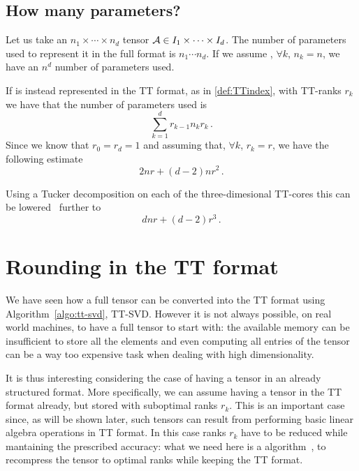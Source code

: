 \subsection{How many parameters?}
Let us take an $n_1 \times \cdots \times n_d$ tensor $\mathcal{A} \in I_1 \times \cdots \times I_d$. The number of parameters used to represent it in the full format is $n_1 \cdots n_d$. If we assume , $\forall k$, $n_k  = n$, we have an $n^d$ number of parameters used.

If \A is instead represented in the TT format, as in \eqref{def:TTindex}, with TT-ranks $r_k$ we have that the number of parameters used is
\begin{equation*}
  \sum_{k=1}^d r_{k-1} n_k r_k\, .
\end{equation*}
Since we know that $r_0 = r_d = 1$ and assuming that, $\forall k$, $r_k = r$, we have the following estimate
\begin{equation*}
  2nr + (d-2)nr^2\, .
\end{equation*}

Using a Tucker decomposition on each of the three-dimesional TT-cores this can be lowered~\cite{oseledets2011tt} further to
\begin{equation*}
  dnr + (d-2)r^3\, .
\end{equation*}

\section{Rounding in the TT format}
We have seen how a full tensor can be converted into the TT format using Algorithm~\ref{algo:tt-svd}, TT-SVD. However it is not always possible, on real world machines, to have a full tensor to start with: the available memory can be insufficient to store all the elements and even computing all entries of the tensor can be a way too expensive task when dealing with high dimensionality.

It is thus interesting considering the case of having a tensor in an already structured format. More specifically, we can assume having a tensor in the TT format already, but stored with suboptimal ranks $r_k$. This is an important case since, as will be shown later, such tensors can result from performing basic linear algebra operations in TT format. In this case ranks $r_k$ have to be reduced while mantaining the prescribed accuracy: what we need here is a  algorithm~\cite{oseledets2011tt}, to recompress the tensor to optimal ranks while keeping the TT format.


